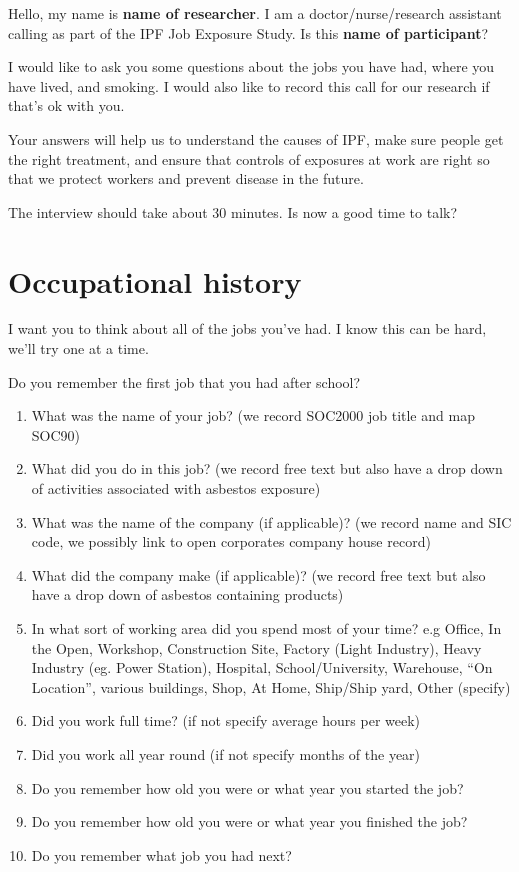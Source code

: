 \documentclass[a4paper,10pt]{article}
\begin{document}
Hello, my name is \textbf{name of researcher}. I am a doctor/nurse/research assistant calling as part of the IPF Job Exposure Study. Is this \textbf{name of participant}? 

I would like to ask you some questions about the jobs you have had, where you have lived, and smoking. I would also like to record this call for our research if that's ok with you.  

Your answers will help us to understand the causes of IPF, make sure people get the right treatment, and ensure that controls of exposures at work are right so that we protect workers and prevent disease in the future.  

The interview should take about 30 minutes. Is now a good time to talk?

\section{Occupational history} 

I want you to think about all of the jobs you've had. I know this can be hard, we'll try one at a time. 

Do you remember the first job that you had after school?

\begin{enumerate}
\item  What was the name of your job? (we record SOC2000 job title and map SOC90)
\item  What did you do in this job? (we record free text but also have a drop down of activities associated with asbestos exposure)
\item  What was the name of the company (if applicable)? (we record name and SIC code, we possibly link to open corporates company house record)
\item  What did the company make (if applicable)? (we record free text but also have a drop down of asbestos containing products)
\item  In what sort of working area did you spend most of your time? e.g Office, In the Open, Workshop, Construction Site, Factory (Light Industry), Heavy Industry (eg. Power Station), Hospital, School/University, Warehouse, “On Location”, various buildings, Shop, At Home, Ship/Ship yard, Other (specify) 
\item  Did you work full time? (if not specify average hours per week)
\item  Did you work all year round (if not specify months of the year)
\item  Do you remember how old you were or what year you started the job?
\item  Do you remember how old you were or what year you finished the job?
\item  Do you remember what job you had next?
\end{enumerate}
\end{document}
